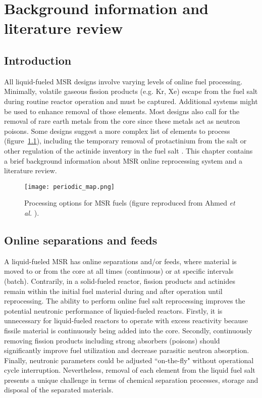 \chapter[Background information and literature review]{Background information and literature review}

\section{Introduction}
All liquid-fueled \gls{MSR} designs involve varying levels of online fuel processing. Minimally, volatile gaseous fission products (e.g. Kr, Xe) escape from the fuel salt during routine reactor operation and must be captured. Additional systems might be used to enhance removal of those elements. Most designs also call for the removal of rare earth metals from the core since these metals act as neutron poisons. Some designs suggest a more complex list of elements to process (figure~\ref{fig:periodic_tab}), including the temporary removal of protactinium from the salt or other regulation of the actinide inventory in the fuel salt \cite{ahmad_neutronics_2015}. This chapter contains a brief background 
information about \gls{MSR} online reprocessing system and a literature review.
\begin{figure}[htp!] %
  \centering
  \texttt{[image: periodic\_map.png]}
  \caption{Processing options for \gls{MSR} fuels (figure reproduced from 
  Ahmed \emph{et al.} \cite{ahmad_neutronics_2015}).}
  \label{fig:periodic_tab}
\end{figure}

\section{Online separations and feeds}
A liquid-fueled \gls{MSR} has online separations and/or feeds, where material 
is moved to or from the core at all times (continuous) or at specific intervals 
(batch). Contrarily, in a solid-fueled reactor, fission products and actinides 
remain within the initial fuel material during and after operation until 
reprocessing. The ability to perform online fuel salt reprocessing improves 
the potential neutronic performance of liquied-fueled reactors. Firstly, it 
is unnecessary for liquid-fueled reactors to operate with excess reactivity 
because fissile material is continuously being added into the core. Secondly, 
continuously removing fission products including strong absorbers (poisons) 
should significantly improve fuel utilization and decrease parasitic 
neutron absorption. Finally, neutronic parameters could be adjusted 
``on-the-fly" without operational cycle interruption. Nevertheless, removal 
of each element from the liquid fuel salt presents a unique challenge in 
terms of chemical separation processes, storage and disposal of the 
separated materials.

